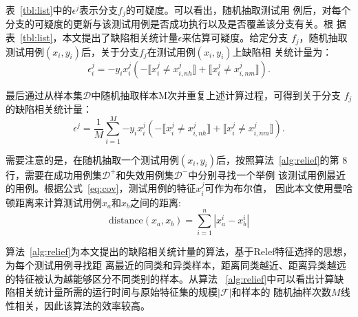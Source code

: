 表~\ref{tbl:list}中的$\epsilon^j$表示分支$f_j$的可疑度。可以看出，随机抽取测试用
例后，对每个分支的可疑度的更新与该测试用例是否成功执行以及是否覆盖该分支有关。根
据表~\ref{tbl:list}，本文提出了缺陷相关统计量$\epsilon$来估算可疑度。给定分支
$f_j$，随机抽取测试用例$(x_i,y_i)$后，关于分支$f_j$在测试用例$(x_i,y_i)$上缺陷相
关统计量为：
\begin{equation}
       \epsilon_i^j = -y_ix_i^j(-\llbracket x_i^j \neq x_{i,nh}^j \rrbracket + \llbracket x_i^j \neq x_{i,nm}^j \rrbracket). \label{eq:epsilon}
\end{equation}

最后通过从样本集$\mathcal D$中随机抽取样本M次并重复上述计算过程，可得到关于分支
$f_j$的缺陷相关统计量：
\begin{equation}
       \epsilon^j = \frac{1}{M}\sum_{i=1}^M{ -y_ix_i^j(-\llbracket x_i^j \neq x_{i,nh}^j \rrbracket + \llbracket x_i^j \neq x_{i,nm}^j \rrbracket)}. \label{eq:epsilon2}
\end{equation}

需要注意的是，在随机抽取一个测试用例$(x_i,y_i)$后，按照算法~\ref{alg:relief}的第
8行，需要在成功用例集$\mathcal D^+$和失效用例集$\mathcal D^-$中分别寻找一个举例
该测试用例最近的用例。根据公式~\eqref{eq:cov}，测试用例的特征$x_i^j$可作为布尔值，
因此本文使用曼哈顿距离来计算测试用例$x_a$和$x_b$之间的距离:
\begin{equation}
      \text{distance}(x_a,x_b) = \sum_{i=1}^n{|x_a^i-x_b^i|}
\end{equation}

算法~\ref{alg:relief}为本文提出的缺陷相关统计量的算法，基于Relef特征选择的思想，为每个测试用例寻找距
离最近的同类和异类样本，距离同类越近、距离异类越远的特征被认为越能够区分不同类别的样本。从算法
~\ref{alg:relief}中可以看出计算缺陷相关统计量所需的运行时间与原始特征集的规模$|\mathcal F|$和样本的
随机抽样次数$M$线性相关，因此该算法的效率较高。

